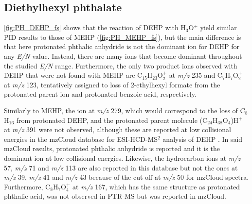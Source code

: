 

\subsection{Diethylhexyl phthalate}




\autoref{fig:PH_DEHP_fs} shows that the reaction of DEHP with H$_3$O$^+$ yield similar PID results to those of MEHP (\autoref{fig:PH_MEHP_fs}), but the main difference is that here protonated phthalic anhydride is not the dominant ion for DEHP for any \textit{E/N} value. 
%
Instead, there are many ions that become dominant throughout the studied \textit{E/N} range.
%
Furthermore, the only two product ions observed with DEHP that were not found with MEHP are  C$_{15}$H$_{23}$O$_2^+$ at \textit{m/z} 235 and C$_7$H$_{7}$O$_2^+$ at \textit{m/z} 123, tentatively assigned to loss of 2-ethylhexyl formate from the protonated parent ion  and protonated benzoic acid, respectively.

Similarly to MEHP, the ion at \textit{m/z} 279, which would correspond to the loss of C$_8$H$_{16}$ from protonated DEHP, and the protonated parent molecule (C$_{24}$H$_{38}$O$_{4}$)H$^+$ at \textit{m/z} 391
were not observed, although these are reported at low collisional energies in the mzCloud database for ESI-HCD-MS$^2$ analysis of DEHP \cite{mzcloudDEHP}.
%
In said mzCloud results, protonated phthalic anhydride is reported and it is the dominant ion at low collisional energies.
%
Likewise, the hydrocarbon ions at \textit{m/z} 57, \textit{m/z} 71 and \textit{m/z} 113 are also reported in this database but not the ones at \textit{m/z} 39, \textit{m/z} 41 and \textit{m/z} 43 because of the  cut-off at \textit{m/z} 50 for mzCloud spectra.
%
Furthermore, C$_8$H$_7$O$_4^+$ at \textit{m/z} 167, which has the same structure as protonated phthalic acid,  was not observed in PTR-MS but was reported in mzCloud.







